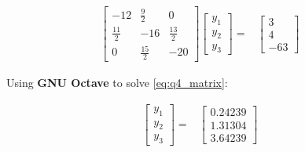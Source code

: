 	\begin{align}
		\begin{bmatrix}
			-12 & \frac{9}{2} & 0 \\[0.7em]
			\frac{11}{2} & -16 & \frac{13}{2} \\[0.7em]
			0 & \frac{15}{2} & -20
		\end{bmatrix}
		\begin{bmatrix}
			y_{1} \\[0.7em]
			y_{2} \\[0.7em]
			y_{3}
		\end{bmatrix}
		=&
		\begin{bmatrix}
			3 \\[0.7em]
			4 \\[0.7em]
			-63
		\end{bmatrix}&
		\label{eq:q4_matrix}
	\end{align}

	Using \textbf{GNU Octave} to solve \cref{eq:q4_matrix}:

	\begin{align}
		\begin{bmatrix}
			y_{1} \\[0.7em]
			y_{2} \\[0.7em]
			y_{3}
		\end{bmatrix}
		=&
		\begin{bmatrix}
			0.24239 \\[0.7em]
			1.31304 \\[0.7em]
			3.64239
		\end{bmatrix}&
	\end{align}
